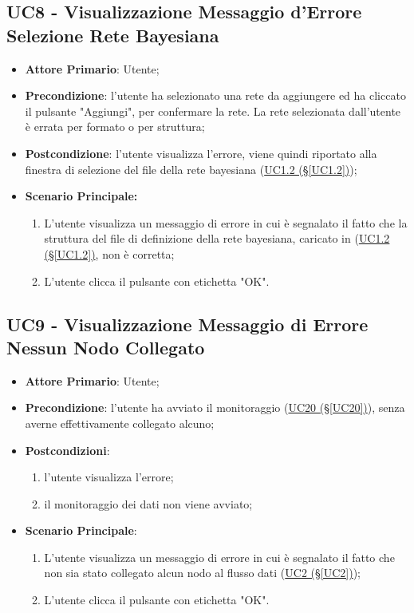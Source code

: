 \subsection{UC8 - Visualizzazione Messaggio d'Errore Selezione Rete Bayesiana}\label{UC8}
\begin{itemize}
\item \textbf{Attore Primario}: Utente;
\item \textbf{Precondizione}: l'utente ha selezionato una rete da aggiungere ed ha cliccato il pulsante "Aggiungi", per confermare la rete. La rete selezionata dall'utente è errata per formato o per struttura;
\item \textbf{Postcondizione}: l'utente visualizza l'errore, viene quindi riportato alla finestra di selezione del file della rete bayesiana (\hyperref[UC1.2]{UC1.2 (§\ref*{UC1.2})});
\item \textbf{Scenario Principale:}
	\begin{enumerate}
	\item L'utente visualizza un messaggio di errore in cui è segnalato il fatto che la struttura del file di definizione della rete bayesiana, caricato in (\hyperref[UC1.2]{UC1.2 (§\ref*{UC1.2})}, non è corretta;
	\item L'utente clicca il pulsante con etichetta "OK".
	\end{enumerate}
\end{itemize}

\pagebreak

\subsection{UC9 - Visualizzazione Messaggio di Errore Nessun Nodo Collegato}\label{UC9}
\begin{itemize}
\item \textbf{Attore Primario}: Utente;
\item \textbf{Precondizione}: l'utente ha avviato il monitoraggio (\hyperref[UC20]{UC20 (§\ref*{UC20})}), senza averne effettivamente collegato alcuno;
\item \textbf{Postcondizioni}:
	\begin{enumerate}
	\item l'utente visualizza l'errore;
	\item il monitoraggio dei dati non viene avviato;
	\end{enumerate}
\item \textbf{Scenario Principale}:
	\begin{enumerate}
	\item L'utente visualizza un messaggio di errore in cui è segnalato il fatto che non sia stato collegato alcun 				nodo al flusso dati (\hyperref[UC2]{UC2 (§\ref*{UC2})});
	\item L'utente clicca il pulsante con etichetta "OK".
	\end{enumerate}
\end{itemize}

